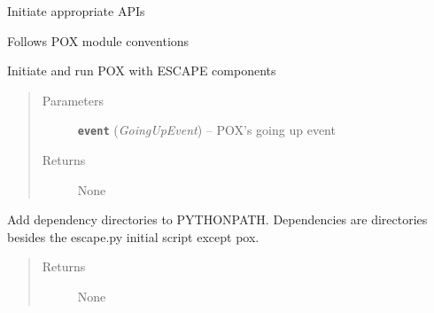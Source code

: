 \documentclass[letterpaper,10pt,english]{sphinxmanual}
\begin{document}
Initiate appropriate APIs

Follows POX module conventions

\begin{fulllineitems}
\label{unify:unify._start_components}
Initiate and run POX with ESCAPE components
\begin{quote}\begin{description}
\item[{Parameters}] \leavevmode
\textbf{\texttt{event}} (\emph{GoingUpEvent}) -- POX's going up event

\item[{Returns}] \leavevmode
None

\end{description}\end{quote}

\end{fulllineitems}


\begin{fulllineitems}
\label{unify:unify.add_dependencies}
Add dependency directories to PYTHONPATH.
Dependencies are directories besides the escape.py initial script except pox.
\begin{quote}\begin{description}
\item[{Returns}] \leavevmode
None

\end{description}\end{quote}

\end{fulllineitems}

\end{document}
